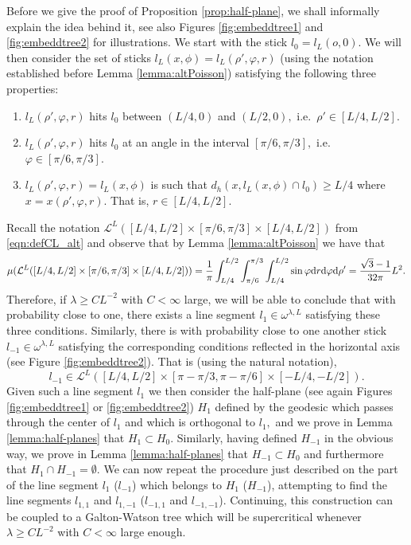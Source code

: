 \documentclass[a4paper,12pt]{article}
\newcommand{\CL}{{\mathcal{L}}}
\newcommand{\dd}{{\rm d}}
\begin{document}
Before we give the proof of Proposition \ref{prop:half-plane}, we shall informally explain the idea behind 
it, see also Figures  \ref{fig:embeddtree1} and \ref{fig:embeddtree2} for 
illustrations. 
We start with the stick $l_0=l_L(o,0)$. We will then consider 
the set of sticks $l_L(x,\phi)=l_L(\rho',\varphi,r)$ (using the notation established
before Lemma \ref{lemma:altPoisson}) satisfying the following 
three properties:
\begin{enumerate}
    \item $l_L(\rho',\varphi,r)$ hits $l_0$ between $(L/4,0)$ and $(L/2,0),$ 
    i.e.\ $\rho'\in[L/4,L/2].$

    \item $l_L(\rho',\varphi,r)$ hits $l_0$ at an angle in the interval 
    $[\pi/6,\pi/3],$ i.e.\  $\varphi\in[\pi/6,\pi/3].$

    \item $l_L(\rho',\varphi,r)=l_L(x,\phi)$ is such that $d_h(x,l_L(x,\phi)\cap l_0)\geq L/4$
    where $x=x(\rho',\varphi,r).$ That is, $r\in[L/4,L/2].$ 
\end{enumerate} 
Recall the notation  $\CL^L([L/4,L/2]\times[\pi/6,\pi/3]\times[L/4,L/2])$ from
\eqref{eqn:defCL_alt} and observe that by Lemma \ref{lemma:altPoisson} we have that 
\begin{equation}\label{eqn:muofsticks}
\mu(\CL^L([L/4,L/2]\times[\pi/6,\pi/3]\times[L/4,L/2])) 
=\frac{1}{\pi}\int_{L/4}^{L/2} \int_{\pi/6}^{\pi/3} \int_{L/4}^{L/2} 
\sin \varphi  \dd r  \dd \varphi \dd \rho'
=\frac{\sqrt{3}-1}{32\pi }L^2. 
\end{equation} 
Therefore, if $\lambda\geq C L^{-2}$ with $C<\infty$ large, we will be able 
to conclude that with probability close to one, there exists a line 
segment $l_1\in \omega^{\lambda,L}$ satisfying 
these three conditions. 
Similarly, there is with probability close to one another stick
$l_{-1}\in \omega^{\lambda,L}$ satisfying the corresponding conditions 
reflected in 
the horizontal axis (see Figure \ref{fig:embeddtree2}). That is (using 
the natural notation),
\[
l_{-1}\in \CL^L([L/4,L/2]\times[\pi-\pi/3,\pi-\pi/6]\times[-L/4,-L/2]).
\]
Given such a line segment $l_1$ we then consider the half-plane (see again Figures
\ref{fig:embeddtree1} or \ref{fig:embeddtree2}) $H_1$ defined by the geodesic 
which passes through the center of $l_1$ and which is orthogonal 
to $l_1,$ and 
we prove in Lemma \ref{lemma:half-planes}
that $H_1 \subset H_0.$ Similarly, having defined $H_{-1}$ in the obvious way, we 
prove in Lemma \ref{lemma:half-planes}
that $H_{-1}\subset H_0$ and furthermore that $H_1 \cap H_{-1}=\emptyset.$
We can now repeat the procedure just described on the part of the line 
segment $l_1$ ($l_{-1}$) which belongs to $H_1$ ($H_{-1}$), attempting to 
find the line segments $l_{1,1}$ and $l_{1,-1}$ ($l_{-1,1}$ and $l_{-1,-1}$).
Continuing, this construction can be coupled to a Galton-Watson tree which will be 
supercritical whenever $\lambda\geq C L^{-2}$ with $C<\infty$ large enough.
\end{document}
